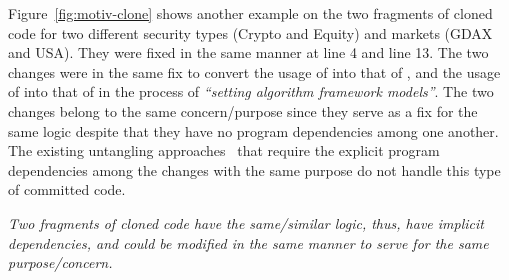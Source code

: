 Figure~\ref{fig:motiv-clone} shows another example on the two
fragments of cloned code for two different security types (Crypto and
Equity) and markets (GDAX and USA). They were fixed in the same manner
at line 4 and line 13. The two changes were in the same fix to convert
the usage of  into that of
, and the usage of
 into that of
 in the process of {\em ``setting
  algorithm framework models''}. The two changes belong to the same
concern/purpose since they serve as a fix for the same logic despite
that they have no program dependencies among one another. The existing
untangling
approaches~\cite{flexeme-fse20,smartcommit-fse21,roover-scam18,barnett-icse15}
that require the explicit program dependencies among the changes with
the same purpose do not handle this type of committed code.

 {\em Two
  fragments of cloned code have the same/similar logic, thus, have
  implicit dependencies, and could be modified in the same manner to
  serve for the same purpose/concern.}




